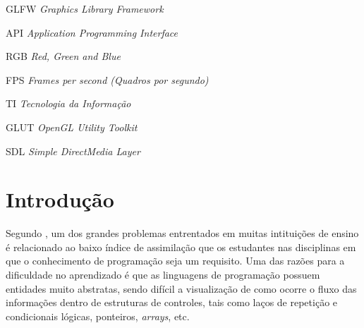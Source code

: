 \documentclass[12pt, %
openright,
oneside, %
a4paper,    %
brazil]{facom-ufu-abntex2}
\begin{document}
\begin{siglas} %
  \item[GLFW] \textit{Graphics Library Framework}
  \item[API] \textit{Application Programming Interface}
  \item[RGB] \textit{Red, Green and Blue}
  \item[FPS] \textit{Frames per second (Quadros por segundo)}
  \item[TI] \textit{Tecnologia da Informação}
  \item[GLUT] \textit{OpenGL Utility Toolkit}
  \item[SDL] \textit{Simple DirectMedia Layer}
\end{siglas}


\tableofcontents*
\cleardoublepage





\textual



\chapter[Introdução]{Introdução}
Segundo \cite{de2004ferramenta}, um dos grandes problemas entrentados em muitas intituições de ensino é relacionado ao baixo índice de assimilação que os estudantes nas disciplinas em que o conhecimento de programação seja um requisito. Uma das razões para a dificuldade no aprendizado é que as linguagens de programação possuem entidades muito abstratas, sendo difícil a visualização de como ocorre o fluxo das informações dentro de estruturas de controles, tais como laços de repetição e condicionais lógicas, ponteiros, \textit{arrays}, etc.
\end{document}
